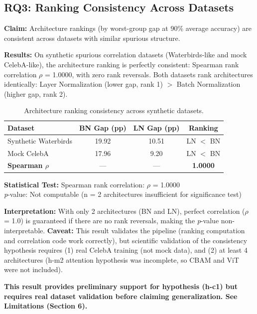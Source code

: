 \subsection{RQ3: Ranking Consistency Across Datasets}

\textbf{Claim:} Architecture rankings (by worst-group gap at 90\% average accuracy) are consistent across datasets with similar spurious structure.

\textbf{Results:} On synthetic spurious correlation datasets (Waterbirds-like and mock CelebA-like), the architecture ranking is perfectly consistent: Spearman rank correlation $\rho$ = 1.0000, with zero rank reversals. Both datasets rank architectures identically: Layer Normalization (lower gap, rank 1) $>$ Batch Normalization (higher gap, rank 2).

\begin{table}[h]
\centering
\caption{Architecture ranking consistency across synthetic datasets.}
\label{tab:rq3_consistency}
\begin{tabular}{lccc}
\toprule
Dataset & BN Gap (pp) & LN Gap (pp) & Ranking \\
\midrule
Synthetic Waterbirds & 19.92 & 10.51 & LN $<$ BN \\
Mock CelebA & 17.96 & 9.20 & LN $<$ BN \\
\textbf{Spearman $\rho$} & --- & --- & \textbf{1.0000} \\
\bottomrule
\end{tabular}
\end{table}

\textbf{Statistical Test:}
Spearman rank correlation: $\rho$ = 1.0000 \\
\emph{p}-value: Not computable (n = 2 architectures insufficient for significance test)

\textbf{Interpretation:} With only 2 architectures (BN and LN), perfect correlation ($\rho$ = 1.0) is guaranteed if there are no rank reversals, making the \emph{p}-value non-interpretable. \textbf{Caveat:} This result validates the pipeline (ranking computation and correlation code work correctly), but scientific validation of the consistency hypothesis requires (1) real CelebA training (not mock data), and (2) at least 4 architectures (h-m2 attention hypothesis was incomplete, so CBAM and ViT were not included).

\textbf{This result provides preliminary support for hypothesis (h-c1) but requires real dataset validation before claiming generalization. See Limitations (Section 6).}

